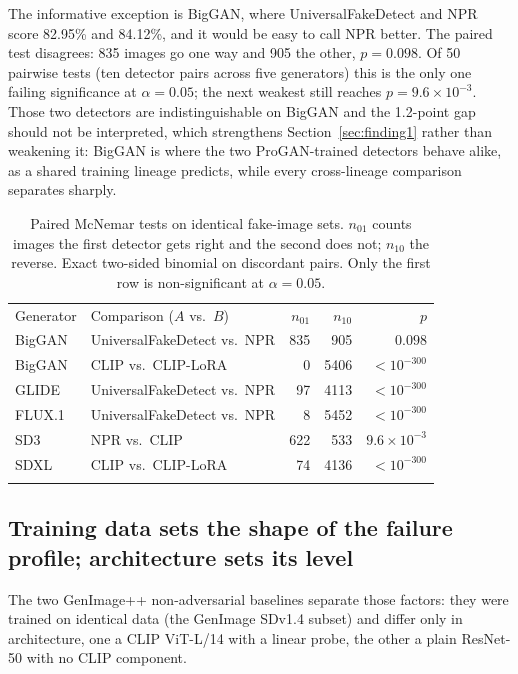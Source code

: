 \documentclass[3p,times,procedia]{elsarticle}
\begin{document}
The informative exception is BigGAN, where UniversalFakeDetect and NPR
score 82.95\% and 84.12\%, and it would be easy to call NPR better. The
paired test disagrees: 835 images go one way and 905 the other, $p=0.098$.
Of 50 pairwise tests (ten detector pairs across five generators) this is
the only one failing significance at $\alpha=0.05$; the next weakest still
reaches $p=9.6\times10^{-3}$. Those two detectors are indistinguishable on
BigGAN and the 1.2-point gap should not be interpreted, which strengthens
Section~\ref{sec:finding1} rather than weakening it: BigGAN is where the
two ProGAN-trained detectors behave alike, as a shared training lineage
predicts, while every cross-lineage comparison separates sharply.

\begin{table}[h]
\caption{Paired McNemar tests on identical fake-image sets. $n_{01}$ counts
images the first detector gets right and the second does not; $n_{10}$ the
reverse. Exact two-sided binomial on discordant pairs. Only the first row
is non-significant at $\alpha=0.05$.}
\label{tab:mcnemar}
\begin{tabular*}{\hsize}{@{\extracolsep{\fill}}llrrr@{}}
\toprule
Generator & Comparison ($A$ vs.\ $B$) & $n_{01}$ & $n_{10}$ & $p$ \\
\colrule
BigGAN & UniversalFakeDetect vs.\ NPR & 835 & 905 & $0.098$ \\
BigGAN & CLIP vs.\ CLIP-LoRA & 0 & 5406 & $<10^{-300}$ \\
GLIDE & UniversalFakeDetect vs.\ NPR & 97 & 4113 & $<10^{-300}$ \\
FLUX.1 & UniversalFakeDetect vs.\ NPR & 8 & 5452 & $<10^{-300}$ \\
SD3 & NPR vs.\ CLIP & 622 & 533 & $9.6\times10^{-3}$ \\
SDXL & CLIP vs.\ CLIP-LoRA & 74 & 4136 & $<10^{-300}$ \\
\botrule
\end{tabular*}
\end{table}

\subsection{Training data sets the shape of the failure profile;
architecture sets its level}
\label{sec:finding-shape}

The two GenImage++ non-adversarial baselines separate those factors: they
were trained on identical data (the GenImage SDv1.4 subset) and differ only
in architecture, one a CLIP ViT-L/14 with a linear probe, the other a plain
ResNet-50 with no CLIP component.
\end{document}
